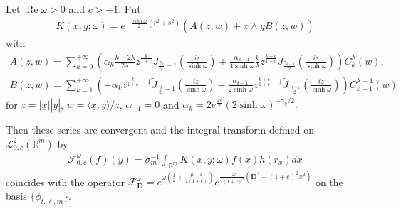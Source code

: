 \documentclass[pdftex]{sigma}
\numberwithin{equation}{section}
\numberwithin{theorem}{section}
\numberwithin{proposition}{section}
\numberwithin{lemma}{section}
\numberwithin{corollary}{section}
\numberwithin{definition}{section}
\numberwithin{example}{section}
\numberwithin{remark}{section}
\numberwithin{note}{section}
\theoremstyle{remark}
\newcommand{\mR}{\mathbb{R}}
\newcommand{\cF}{\mathcal{F}}
\newcommand{\cL}{\mathcal{L}}
\newcommand{\dD}{\textbf{D}}
\newcommand{\ux}{\underline{x}}
\newcommand{\uy}{\underline{y}}
\def\l{{\lambda}}
\def\d{{\delta}}
\def\o{{\omega}}
\def\la{{\langle}}
\def\ra{{\rangle}}
\begin{document}
\begin{theorem}
\label{seriesholom}
Let $\operatorname{Re}\o>0$ and $c>-1$.
Put
\begin{gather*}K(x,y;\omega)=e^{-\frac{\coth{\o}}{2}(r^{2}+s^{2})}\left(A(z,w)+\ux\wedge\uy
B(z,w)\right)
\end{gather*} with
\begin{gather*}
A(z,w) = \sum_{k=0}^{+\infty} \left(\alpha_{k} \frac{k+2\l}{2\l} z^{\frac{k}{1+c}}
\widetilde{J}_{\frac{\gamma_{k}}{2}-1}\left(\frac{iz}{\sinh{\o}}\right) +\frac{
\alpha_{k-1}}{4\sinh{\o}} \frac{k}{\l} z^{\frac{k+c}{1+c}}
\widetilde{J}_{\frac{\gamma_{k-1}}{2}}\left(\frac{iz}{\sinh{\o}}\right)\right) C_{k}^{\l}(w),\\
B(z,w) = \sum_{k=1}^{+\infty} \left(-\alpha_{k} z^{\frac{k}{1+c}-1}
\widetilde{J}_{\frac{\gamma_{k}}{2}-1}\left(\frac{iz}{\sinh{\o}}\right) +
\frac{\alpha_{k-1}}{2\sinh{\o}} z^{\frac{k+c}{1+c}-1}
\widetilde{J}_{\frac{\gamma_{k-1}}{2}}\left(\frac{iz}{\sinh{\o}}\right)\right) C_{k-1}^{\l+1}(w)
\end{gather*}
for $z=|\ux||\uy|$, $w=\la\ux,\uy\ra/z$, $\alpha_{-1}=0$ and
$%
\alpha_{k}=2e^{\frac{\o\d}{2}}(2\sinh{\o})^{-\gamma_{k}/2}.
$%

Then these series are convergent and the integral transform defined on $\cL^{2}_{0,c}(\mR^{m})$ by
\begin{gather*}
\cF_{0,c}^{\o}(f)(y)=\sigma_{m}^{-1}\int_{\mR^{m}}K(x,y;\omega)f(x)h(r_{x})dx
\end{gather*}
coincides with the operator $\cF_{\dD}^{\o}=e^{\o\left(\frac{1}{2}+\frac{\mu-1}{2(1+c)}
\right)}e^{\frac{-\o}{2(1+c)^{2}}\left(\dD^{2}-(1+c)^{2}\ux^{2}\right)}$ on the basis $\{
\phi_{t,\ell,m}\}$.
\end{theorem}
\end{document}

